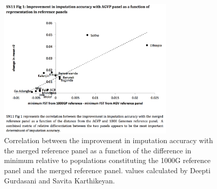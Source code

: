 \begin{figure}
\centering
\includegraphics[trim={0 3.5cm 0cm 1.25cm},clip,width=0.75\textwidth]{fig/SN11f1}
\caption[
Improvement in imputation accuracy for each population using two different reference panels as a function of difference in minimum  between each population in either of the two reference panels.]{
Correlation between the improvement in imputation accuracy with the merged reference panel as a function of the difference in minimum  relative to populations constituting the \gls{1000G} reference panel and the merged reference panel.  values calculated by Deepti Gurdasani and Savita Karthikeyan.}
\label{fig:SN10f1}
\end{figure}